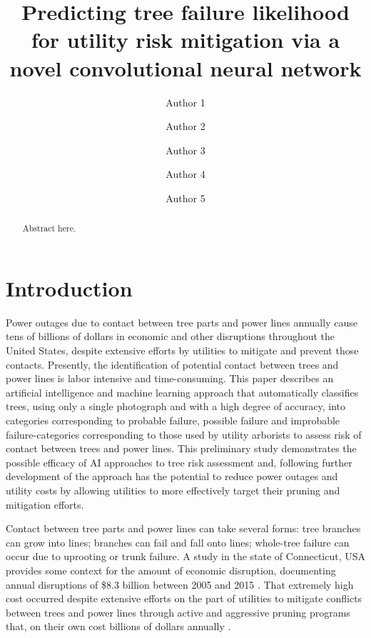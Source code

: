 \documentclass[Journal,letterpaper, SingleSpace, InsideFigs]{ascelike-new}
\begin{document}
\title{Predicting tree failure likelihood for utility risk mitigation via a novel convolutional neural network}
\author[1]{Author 1}
\author[1]{Author 2}
\author[2]{Author 3}
\author[2]{Author 4}
\author[2]{Author 5}


\maketitle

\begin{abstract}
    Abstract here.
\end{abstract}

\section{Introduction}
Power outages due to contact between tree parts and power lines annually cause tens of billions of dollars in economic and other disruptions throughout the United States, despite extensive efforts by utilities to mitigate and prevent those contacts.  Presently, the identification of potential contact between trees and power lines is labor intensive and time-consuming.  This paper describes an artificial intelligence and machine learning approach that automatically classifies trees, using only a single photograph and with a high degree of accuracy, into categories corresponding to probable failure, possible failure and improbable failure-categories corresponding to those used by utility arborists to assess risk of contact between trees and power lines.  This preliminary study demonstrates the possible efficacy of AI approaches to tree risk assessment and, following further development of the approach has the potential to reduce power outages and utility costs by allowing utilities to more effectively target their pruning and mitigation efforts.  

Contact between tree parts and power lines can take several forms: tree branches can grow into lines; branches can fail and fall onto lines; whole-tree failure can occur due to uprooting or trunk failure.  A study in the state of Connecticut, USA provides some context for the amount of economic disruption, documenting annual disruptions of \$8.3 billion between 2005 and 2015 \cite{graziano2020wider}.  That extremely high cost occurred despite extensive efforts on the part of utilities to mitigate conflicts between trees and power lines through active and aggressive pruning programs that, on their own cost billions of dollars annually \cite{guggenmoos2003effects}.  
\end{document}
